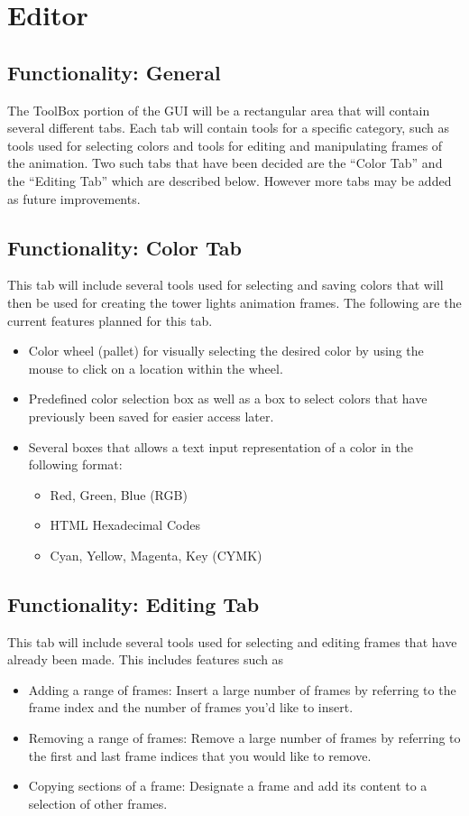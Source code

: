 \documentclass{article}
\begin{document}
	\section{Editor}
	
	\subsection{Functionality: General}
	The ToolBox portion of the GUI will be a rectangular area that will contain several different tabs. Each tab will contain tools for a specific category, such as tools used for selecting colors and tools for editing and manipulating frames of the animation. Two such tabs that have been decided are the “Color Tab” and the “Editing Tab” which are described below. However more tabs may be added as future improvements.
	\subsection{Functionality: Color Tab}
This tab will include several tools used for selecting and saving colors that will then be used for creating the tower lights animation frames. The following are the current features planned for this tab.
	\begin{itemize}
			\item Color wheel (pallet) for visually selecting the desired color by using the mouse to click on a location within the wheel.
			\item Predefined color selection box as well as a box to select colors that have previously been saved for easier access later.
			\item Several  boxes that allows a text input representation of a color in the following format:
		\begin{itemize}
				\item Red, Green, Blue (RGB)
				\item HTML Hexadecimal Codes
				\item Cyan, Yellow, Magenta, Key (CYMK)
		\end{itemize}
	\end{itemize}

	\subsection{Functionality: Editing Tab}
	This tab will include several tools used for selecting and editing frames that have already been made. This includes features such as
	\begin{itemize}
			\item Adding a range of frames: Insert a large number of frames by referring to the frame index and the number of frames you'd like to insert.
			\item Removing a range of frames: Remove a large number of frames by referring to the first and last frame indices that you would like to remove.
			\item Copying sections of a frame: Designate a frame and add its content to a selection of other frames.
	\end{itemize}
	
\end{document}
